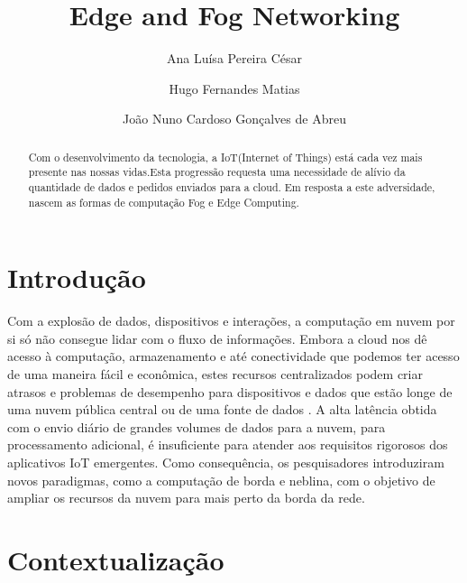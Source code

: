 \documentclass{llncs}
\begin{document}
\mainmatter
\title{Edge and Fog Networking}


\author{Ana Luísa Pereira César\and Hugo Fernandes Matias \and João Nuno Cardoso Gonçalves de Abreu }




\date{}


\maketitle
\begin{abstract}
Com o desenvolvimento da tecnologia, a IoT(Internet of Things) está cada vez mais presente nas nossas vidas.Esta progressão requesta uma necessidade de alívio da quantidade de dados e pedidos enviados para a cloud. Em resposta a este adversidade, nascem as formas de computação Fog e Edge Computing.
\end{abstract}

\section{Introdução}

Com a explosão de dados, dispositivos e interações, a computação em nuvem por si só não consegue lidar com o fluxo de informações. Embora a cloud nos dê acesso à computação, armazenamento e até conectividade que podemos ter acesso de uma maneira fácil e econômica, estes recursos centralizados podem criar atrasos e problemas de desempenho para dispositivos e dados que estão longe de uma nuvem pública central ou de uma fonte de dados .\cite{1}
A alta latência obtida com o envio diário de grandes volumes de dados para a nuvem, para processamento adicional, é insuficiente para atender aos requisitos rigorosos dos aplicativos IoT emergentes. Como consequência, os pesquisadores introduziram novos paradigmas, como a computação de borda e neblina, com o objetivo de ampliar os recursos da nuvem para mais perto da borda da rede.\cite{2} 


\section{Contextualização}
\end{document}
